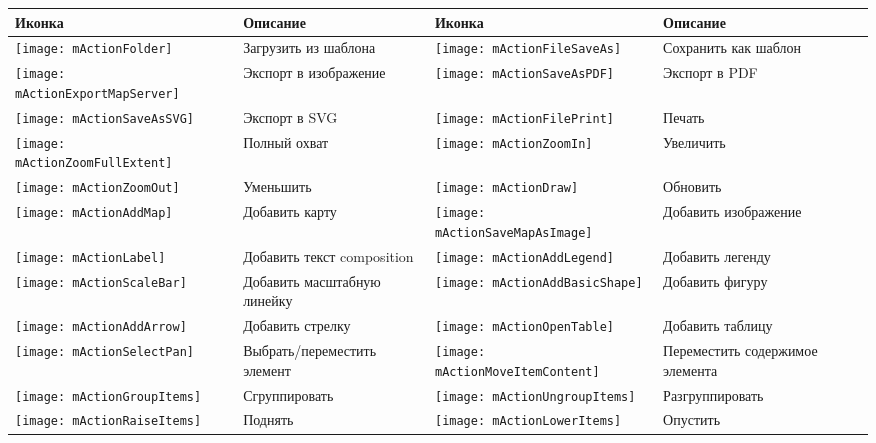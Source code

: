 \begin{table}[h]
\centering\small
\renewcommand{\arraystretch}{2}
 \begin{tabular}{|m{1cm}|m{5.4cm}|m{1cm}|m{5.4cm}|}
 \hline \textbf{Иконка} & \textbf{Описание} & \textbf{Иконка} &
 \textbf{Описание} \\
 \hline \texttt{[image: mActionFolder]}
 & Загрузить из шаблона &
 \texttt{[image: mActionFileSaveAs]} & Сохранить как шаблон \\
 \hline \texttt{[image: mActionExportMapServer]}
 & Экспорт в изображение &
 \texttt{[image: mActionSaveAsPDF]} & Экспорт в PDF \\
 \hline \texttt{[image: mActionSaveAsSVG]} & Экспорт в SVG
 & \texttt{[image: mActionFilePrint]}
 & Печать \\
 \hline \texttt{[image: mActionZoomFullExtent]} & Полный
 охват & \texttt{[image: mActionZoomIn]} & Увеличить \\
 \hline \texttt{[image: mActionZoomOut]} & Уменьшить&
 \texttt{[image: mActionDraw]} & Обновить \\
 \hline \texttt{[image: mActionAddMap]} & Добавить
 карту & \texttt{[image: mActionSaveMapAsImage]}
 & Добавить изображение \\
 \hline \texttt{[image: mActionLabel]} & Добавить текст
 composition & \texttt{[image: mActionAddLegend]} & Добавить
 легенду \\
 \hline \texttt{[image: mActionScaleBar]} & Добавить
 масштабную линейку & \texttt{[image: mActionAddBasicShape]}
 & Добавить фигуру \\
 \hline \texttt{[image: mActionAddArrow]} & Добавить
 стрелку & \texttt{[image: mActionOpenTable]} & Добавить
 таблицу \\
 \hline \texttt{[image: mActionSelectPan]} & Выбрать/переместить
 элемент &
 \texttt{[image: mActionMoveItemContent]} & Переместить
 содержимое элемента \\
 \hline \texttt{[image: mActionGroupItems]} & Сгруппировать &
 \texttt{[image: mActionUngroupItems]} & Разгруппировать \\
 \hline \texttt{[image: mActionRaiseItems]} & Поднять &
 \texttt{[image: mActionLowerItems]} & Опустить \\

\end{tabular}
\end{table}
